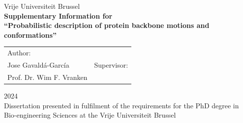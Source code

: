 \documentclass[A4paper, 12pt]{book}
\begin{document}
\frontmatter

\begin{titlepage}
    \centering
    \vspace*{1cm}

    {\LARGE Vrije Universiteit Brussel}\\
    \vspace{1cm}
    \textbf{\LARGE Supplementary Information for\\``Probabilistic description of protein backbone motions and conformations''}

    \vspace{1.5cm}

    \begin{tabular}{p{} p{}}
        \centering Author:\\Jose Gavaldá-García &
        \centering Supervisor:\\Prof. Dr. Wim F. Vranken \\
    \end{tabular}


    \vspace{2cm}

    \large{2024}\\[1cm]
    \normalsize{Dissertation presented in fulfilment of the requirements for the PhD degree in Bio-engineering Sciences at the Vrije Universiteit Brussel}

    \vfill %


\end{titlepage}
\end{document}
